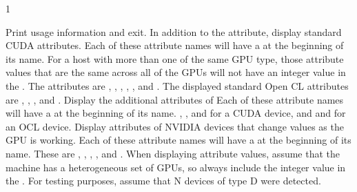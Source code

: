 \begin{ManPage}{\label{man-condor-gpu-discovery}}{1}
\begin{Options}
   {
    Print usage information and exit.
  }
   {
    In addition to the  attribute, display 
    standard CUDA attributes.
    Each of these attribute names will have a 
    at the beginning of its name.
    For a host with more than one of the same GPU type,
    those attribute values that are the same across all of the GPUs
    will not have an integer value in the .
    The attributes are
    , , , 
    , , and .
    The displayed standard Open CL attributes are
    , , , and
    .
  }
   {
    Display the additional attributes of
    Each of these attribute names will have a 
    at the beginning of its name.
    , , and 
    for a CUDA device,
    and
     and  for an OCL device.
  }
   {
    Display attributes of NVIDIA devices that change values as the GPU 
    is working.
    Each of these attribute names will have a 
    at the beginning of its name.
    These are , , , 
    , and .
  }
   {
    When displaying attribute values, assume that the machine has a
    heterogeneous set of GPUs,
    so always include the integer value in the .
  }
   {
    For testing purposes, assume that N devices of type D were detected.
}
\end{Options}
\end{ManPage}
